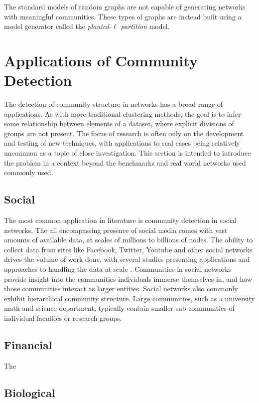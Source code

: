 The standard models of random graphs are not capable of generating networks with meaningful communities. These types of graphs are instead built using a model generator called the \textit{planted-$\ell$ partition} model.


\section{Applications of Community Detection}
The detection of community structure in networks has a broad range of applications. As with more traditional clustering methods, the goal is to infer some relationship between elements of a dataset, where explicit divisions of groups are not present. The focus of research is often only on the development and testing of new techniques, with applications to real cases being relatively uncommon as a topic of close investigation. This section is intended to introduce the problem in a context beyond the benchmarks and real world networks used commonly used.

\subsection{Social}

The most common application in literature is community detection in social networks. The all encompassing presence of social media comes with vast amounts of available data, at scales of millions to billions of nodes. The ability to collect data from sites like Facebook, Twitter, Youtube and other social networks drives the volume of work done, with several studies presenting applications and approaches to handling the data at scale \cite{Amor2015,Zhang2015,Feng2016,Mislove2007,Papadopoulos2012}. Communities in social networks provide insight into the communities individuals immerse themselves in, and how those communities interact as larger entities. Social networks also commonly exhibit hierarchical community structure. Large communities, such as a university math and science department, typically contain smaller sub-communities of individual faculties or research groups.

\subsection{Financial}

The 
\cite{liu2016graph}

\subsection{Biological}

